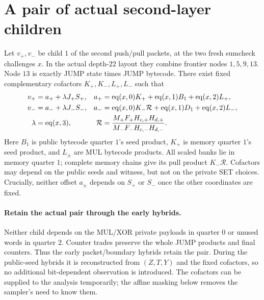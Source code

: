 \documentclass[11pt]{article}
\begin{document}
\section{A pair of actual second-layer children}

Let $v_+,v_-$ be child $1$ of the second push/pull packets, at the two fresh sumcheck challenges $x$. In the actual depth-$22$ layout they combine frontier nodes $1,5,9,13$. Node $13$ is exactly JUMP state times JUMP bytecode. There exist fixed complementary cofactors $K_+,K_-,L_+,L_-$ such that
\[
\begin{aligned}
 v_+&=a_++\lambda J_+S_+,&
 a_+&=\operatorname{eq}(x,0)K_++\operatorname{eq}(x,1)B_1+\operatorname{eq}(x,2)L_+,\\
 v_-&=a_-+\lambda J_-S_-,&
 a_-&=\operatorname{eq}(x,0)K_-\mathcal R+\operatorname{eq}(x,1)D_1+\operatorname{eq}(x,2)L_-,\\
 \lambda&=\operatorname{eq}(x,3),&
 \mathcal R&=\frac{M_+F_+H_{c,+}H_{d,+}}{M_-F_-H_{c,-}H_{d,-}}.
\end{aligned}
\]
Here $B_1$ is public bytecode quarter $1$'s seed product, $K_+$ is memory quarter $1$'s seed product, and $L_\pm$ are MUL bytecode products. All scaled banks lie in memory quarter $1$; complete memory chains give its pull product $K_-\mathcal R$. Cofactors may depend on the public seeds and witness, but not on the private SET choices. Crucially, neither offset $a_\pm$ depends on $S_+$ or $S_-$ once the other coordinates are fixed.

\paragraph{Retain the actual pair through the early hybrids.} Neither child depends on the MUL/XOR private payloads in quarter $0$ or unused words in quarter $2$. Counter trades preserve the whole JUMP products and final counters. Thus the early packet/boundary hybrids retain the pair. During the public-seed hybrids it is reconstructed from $(Z,T,Y)$ and the fixed cofactors, so no additional bit-dependent observation is introduced. The cofactors can be supplied to the analysis temporarily; the affine masking below removes the sampler's need to know them.
\end{document}
